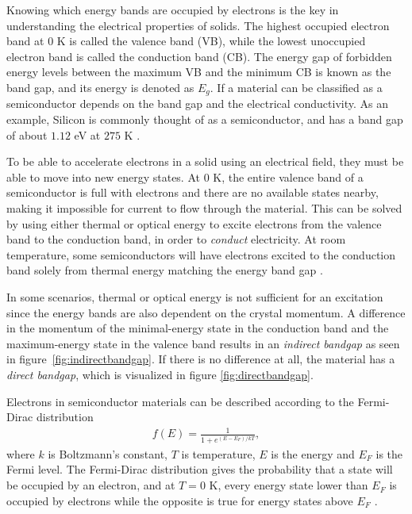 

Knowing which energy bands are occupied by electrons is the key in understanding the electrical properties of solids. The highest occupied electron band at $0$ K is called the valence band (VB), while the lowest unoccupied electron band is called the conduction band (CB). The energy gap of forbidden energy levels between the maximum VB and the minimum CB is known as the band gap, and its energy is denoted as $E_g$. If a material can be classified as a semiconductor depends on the band gap and the electrical conductivity. As an example, Silicon is commonly thought of as a semiconductor, and has a band gap of about $1.12$ eV at $275$ K \cite{Martienssen2005}.

To be able to accelerate electrons in a solid using an electrical field, they must be able to move into new energy states. At $0$ K, the entire valence band of a semiconductor is full with electrons and there are no available states nearby, making it impossible for current to flow through the material. This can be solved by using either thermal or optical energy to excite electrons from the valence band to the conduction band, in order to \textit{conduct} electricity. At room temperature, some semiconductors will have electrons excited to the conduction band solely from thermal energy matching the energy band gap \cite{BenStreetman2015}.

In some scenarios, thermal or optical energy is not sufficient for an excitation since the energy bands are also dependent on the crystal momentum. A difference in the momentum of the minimal-energy state in the conduction band and the maximum-energy state in the valence band results in an \textit{indirect bandgap} as seen in figure \ref{fig:indirectbandgap}. If there is no difference at all, the material has a \textit{direct bandgap}, which is visualized in figure \ref{fig:directbandgap}.

Electrons in semiconductor materials can be described according to the Fermi-Dirac distribution
\begin{align*}
  f(E) = \frac{1}{1+e^{(E-E_F)/kT}},
\end{align*}
where $k$ is Boltzmann's constant, $T$ is temperature, $E$ is the energy and $E_F$ is the Fermi level. The Fermi-Dirac distribution gives the probability that a state will be occupied by an electron, and at $T=0$ K, every energy state lower than $E_F$ is occupied by electrons while the opposite is true for energy states above $E_F$ \cite{BenStreetman2015}.

